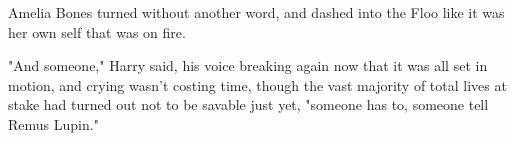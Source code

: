 Amelia Bones turned without another word, and dashed into the Floo like it was
her own self that was on fire.

"And someone," Harry said, his voice breaking again now that it was all set in
motion, and crying wasn't costing time, though the vast majority of total lives
at stake had turned out not to be savable just yet, "someone has to, someone
tell Remus Lupin."
